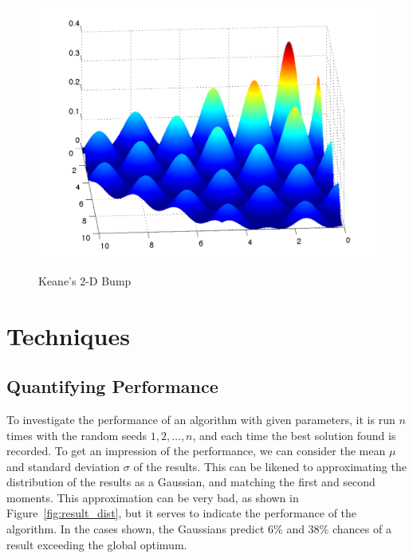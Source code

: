 \documentclass[10pt]{article}
\begin{document}
\begin{figure}
  \begin{center}
    \includegraphics[height=9cm]{bump_3d_smooth.pdf}
    \end{center}
    \caption{Keane's 2-D Bump}
    \label{fig:bump_3d}
    \end{figure}

\section{Techniques}

\subsection{Quantifying Performance}

\label{sec:quant_perf}

To investigate the performance of an algorithm with given parameters, it is
run $n$ times with the random seeds $1, 2, \dots, n$, and each time the best
solution found is recorded. To get an impression of the performance, we can
consider the mean $\mu$ and standard deviation $\sigma$ of the results. This
can be likened to approximating the distribution of the results as a Gaussian,
and matching the first and second moments. This approximation can be very bad,
as shown in Figure~\ref{fig:result_dist}, but it serves to indicate the
performance of the algorithm. In the cases shown, the Gaussians predict 6\%
and 38\% chances of a result exceeding the global optimum.
\end{document}
